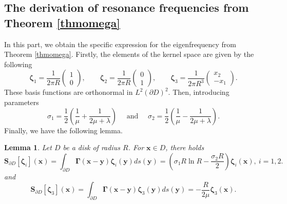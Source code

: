 \documentclass[10pt,reqno,oneside]{amsart}%
\newtheorem{lem}{Lemma}[section]
\theoremstyle{definition}
\theoremstyle{remark}
\numberwithin{equation}{section}
\numberwithin{equation}{section}
\begin{document}
\subsection{The derivation of resonance frequencies from Theorem \ref{thmomega}} In this part, we obtain the specific expression for the eigenfrequency from Theorem \ref{thmomega}. Firstly, the elements of the kernel space are given by the following%
\begin{equation}
\boldsymbol{\zeta}_1=\frac{1}{{2\pi R}}\left(\begin{array}{l}
1  \\
0
\end{array}\right),\quad\quad
\boldsymbol{\zeta}_2=\frac{1}{{2\pi R}}\left(\begin{array}{l}
0  \\
1
\end{array}\right),\quad\quad
\boldsymbol{\zeta}_3=\frac{1}{{2\pi R^3}}\left(\begin{array}{l}
x_2  \\
-x_1
\end{array}\right).\nonumber
\end{equation}
These basis functions are orthonormal in $L^{2}(\partial D)^{2}$. Then, introducing parameters
\begin{equation}
\sigma_1=\frac{1}{2}\left(\frac{1}{\mu}+\frac{1}{2 \mu+\lambda}\right) \quad \text { and } \quad \sigma_2=\frac{1}{2}\left(\frac{1}{\mu}-\frac{1}{2 \mu+\lambda}\right).\nonumber
\end{equation}
Finally, we have the following lemma.
\begin{lem}\label{disk singlelayer}
Let $D$ be a disk of radius $R$. For $\mathbf{x}\in D$, there holds
\begin{equation}\label{disk singlelayer1}
{\mathbf{S}}_{\partial D}[\boldsymbol{\zeta}_i](\mathbf{x})=\int_{\partial D} \boldsymbol{\Gamma}(\mathbf{x}-\mathbf{y}) \boldsymbol{\zeta}_i(\mathbf{y}) d s(\mathbf{y})=\left(\sigma_1R\ln R-\frac{\sigma_2R}{2}\right)\boldsymbol{\zeta}_i(\mathbf{x}),\ i=1,2.
\end{equation}
and
\begin{equation}\label{disk singlelayer2}
{\mathbf{S}}_{\partial D}[\boldsymbol{\zeta}_3](\mathbf{x})=\int_{\partial D} \boldsymbol{\Gamma}(\mathbf{x}-\mathbf{y}) \boldsymbol{\zeta}_3(\mathbf{y}) d s(\mathbf{y})={-\frac{R}{2\mu}}\boldsymbol{\zeta}_3(\mathbf{x}).
\end{equation}
\end{lem}
\end{document}
